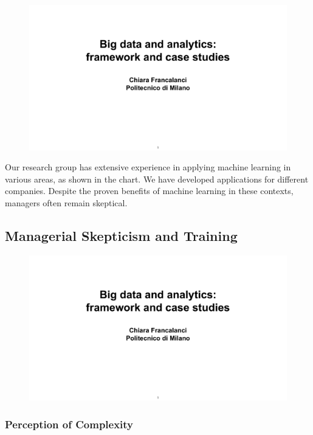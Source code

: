 \begin{figure}[!h]
  \centering
  \includegraphics[page=24, trim = 0cm 2cm 1.5cm 3.5cm, clip, width=\imagewidth]{images/06 - BIG_DATA.pdf}
\end{figure}


Our research group has extensive experience in applying machine learning
in various areas, as shown in the chart. We have developed
applications for different companies. Despite the proven benefits of
machine learning in these contexts, managers often remain skeptical.

\subsection{Managerial Skepticism and Training}

\begin{figure}[!h]
  \centering
  \includegraphics[page=25, trim = 0cm 3.5cm 1.5cm 1.2cm, clip, width=\imagewidth]{images/06 - BIG_DATA.pdf}
\end{figure}

\subsubsection{Perception of Complexity}

